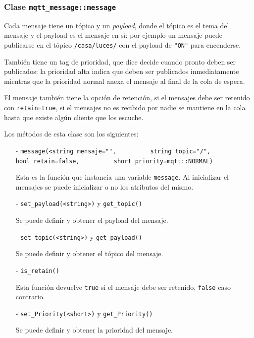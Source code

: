 \subsubsection{Clase \texttt{mqtt\_message::message}}

Cada mensaje tiene un tópico y un \emph{payload}, donde el tópico es el tema del mensaje y el payload es el mensaje en sí: por ejemplo un mensaje puede publicarse en el tópico \verb|/casa/luces/| con el payload de \verb|"ON"| para encenderse.

También tiene un tag de prioridad, que dice decide cuando pronto deben ser publicados: la prioridad alta indica que deben ser publicados inmediatamente mientras que la prioridad normal anexa el mensaje al final de la cola de espera.

El mensaje también tiene la opción de retención, si el mensajes debe ser retenido con \verb|retain=true|, si el mensajes no es recibido por nadie se mantiene en la cola hasta que existe algún cliente que los escuche.

Los métodos de esta clase son los siguientes:

\begin{itemize}
   \item[-] \verb|message(<string mensaje="",|
    \verb|         string topic="/",|
    \verb|         bool retain=false,|
    \verb|         short priority=mqtt::NORMAL)|

    Esta es la función que instancia una variable \verb|message|. Al inicializar el mensajes se puede inicializar o no los atributos del mismo.

    \item[-] \verb|set_payload(<string>)| y \verb|get_topic()|
    
    Se puede definir y obtener el payload del mensaje.

    \item[-] \verb|set_topic(<string>)| y \verb|get_payload()|

    Se puede definir y obtener el tópico del mensaje.

    \item[-] \verb|is_retain()|
    
    Esta función devuelve \verb|true| si el mensaje  debe ser retenido, \verb|false| caso contrario.

    \item[-] \verb|set_Priority(<short>)| y \verb|get_Priority()|
    
    Se puede definir y obtener la prioridad del mensaje.
\end{itemize}


